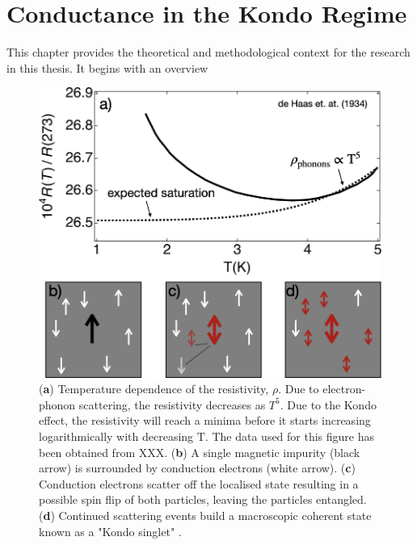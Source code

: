 \chapter{Conductance in the Kondo Regime}\label{cha:kondo_conductance}


    This chapter provides the theoretical and methodological context for the research in this thesis. 
    It begins with an overview  

\begin{figure}[ht]
  \begin{center}
    \includegraphics[width=1.0\textwidth]{figures/ch2/crop_PosterFiguresMaster.006.png}
    \caption[Kondo effect in bulk materials]{\label{fig:ch2/kondo_bulkmetal} 
    (\textbf{a}) Temperature dependence of the resistivity, $\rho$. Due to electron-phonon scattering, the resistivity decreases as $T^5$. Due to the Kondo effect, the resistivity will reach a minima before it starts increasing logarithmically with decreasing $\mathrm{T}$. The data used for this figure has been obtained from XXX. (\textbf{b}) A single magnetic impurity (black arrow) is surrounded by conduction electrons (white arrow). (\textbf{c}) Conduction electrons scatter off the localised state resulting in a possible spin flip of both particles, leaving the particles entangled. (\textbf{d}) Continued scattering events build a macroscopic coherent state known as a "Kondo singlet" .
      }
  \end{center}
\end{figure}


